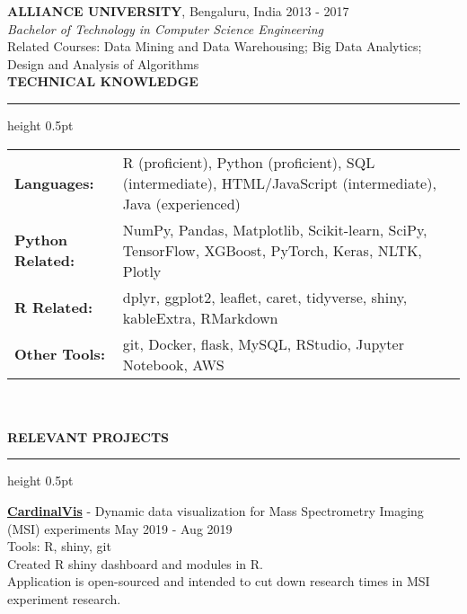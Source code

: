 \documentclass[a4paper]{article}
\newcommand{\myline}{\par
  \kern2pt %
  \hrule height 0.5pt
  \kern2pt %
}
\newcommand{\mybullet}{
	\indent 
  \textbullet \hspace*{2mm}
}
\begin{document}
 	\noindent
	\textbf{ALLIANCE UNIVERSITY}, Bengaluru, India \hfill 2013 - 2017 \\
	\textit{Bachelor of Technology in Computer Science Engineering} \\
  Related Courses: Data Mining and Data Warehousing; Big Data Analytics; Design and Analysis of Algorithms \\

\noindent
{\large \textbf{TECHNICAL KNOWLEDGE}}
\myline 
	
	\noindent
	\begin{tabular}{m{2.5cm} l }
    \textbf{Languages: } & R (proficient), Python (proficient), SQL (intermediate), HTML/JavaScript (intermediate), Java (experienced) \\ 
    \textbf{Python Related: } & NumPy, Pandas, Matplotlib, Scikit-learn, SciPy, TensorFlow, XGBoost, PyTorch, Keras, NLTK, Plotly \\ 
    \textbf{R Related: } & dplyr, ggplot2, leaflet, caret, tidyverse, shiny, kableExtra, RMarkdown \\
    \textbf{Other Tools: } & git, Docker, flask, MySQL, RStudio, 
                Jupyter Notebook, AWS \\
	\end{tabular} \\ \\
	
\noindent
{\large \textbf{RELEVANT PROJECTS}}
\myline 
\smallskip

      \noindent
      \textbf{\href{https://github.com/kuwisdelu/CardinalVis/}{CardinalVis}} - 
      Dynamic data visualization for Mass Spectrometry Imaging (MSI) experiments 
      \hfill May 2019 - Aug 2019 \\
      Tools: R, shiny, git \\
      \mybullet Created R shiny dashboard and modules in R. \\
      \mybullet Application is open-sourced and intended to cut down research times in MSI experiment research. \\
\end{document}
